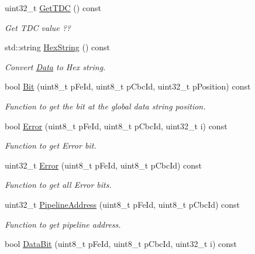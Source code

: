 \begin{DoxyCompactItemize}
uint32\-\_\-t \hyperlink{class_ph2___hw_interface_1_1_event_a2c193b4b2bdb35267f63d03cc684e7b1}{Get\-T\-D\-C} () const 
\begin{DoxyCompactList}\small\item\em Get T\-D\-C value ?? \end{DoxyCompactList}\item 
std\-::string \hyperlink{class_ph2___hw_interface_1_1_event_a1dd8d9cc8a8169df80518d57b1075d2c}{Hex\-String} () const 
\begin{DoxyCompactList}\small\item\em Convert \hyperlink{class_ph2___hw_interface_1_1_data}{Data} to Hex string. \end{DoxyCompactList}\item 
bool \hyperlink{class_ph2___hw_interface_1_1_event_a5b542b0d98a413feef14cc57cff250bf}{Bit} (uint8\-\_\-t p\-Fe\-Id, uint8\-\_\-t p\-Cbc\-Id, uint32\-\_\-t p\-Position) const 
\begin{DoxyCompactList}\small\item\em Function to get the bit at the global data string position. \end{DoxyCompactList}\item 
bool \hyperlink{class_ph2___hw_interface_1_1_event_ae0242a4b78e3da2959a2bcfb8adb86f9}{Error} (uint8\-\_\-t p\-Fe\-Id, uint8\-\_\-t p\-Cbc\-Id, uint32\-\_\-t i) const 
\begin{DoxyCompactList}\small\item\em Function to get Error bit. \end{DoxyCompactList}\item 
uint32\-\_\-t \hyperlink{class_ph2___hw_interface_1_1_event_ab3bbc58be7f96ba0dbc1721eb90d4380}{Error} (uint8\-\_\-t p\-Fe\-Id, uint8\-\_\-t p\-Cbc\-Id) const 
\begin{DoxyCompactList}\small\item\em Function to get all Error bits. \end{DoxyCompactList}\item 
uint32\-\_\-t \hyperlink{class_ph2___hw_interface_1_1_event_a2597189e1c09b65433df4489f5afbf56}{Pipeline\-Address} (uint8\-\_\-t p\-Fe\-Id, uint8\-\_\-t p\-Cbc\-Id) const 
\begin{DoxyCompactList}\small\item\em Function to get pipeline address. \end{DoxyCompactList}\item 
bool \hyperlink{class_ph2___hw_interface_1_1_event_a3e93e6f16944f443caffd2df81262fbe}{Data\-Bit} (uint8\-\_\-t p\-Fe\-Id, uint8\-\_\-t p\-Cbc\-Id, uint32\-\_\-t i) const 

\end{DoxyCompactItemize}
